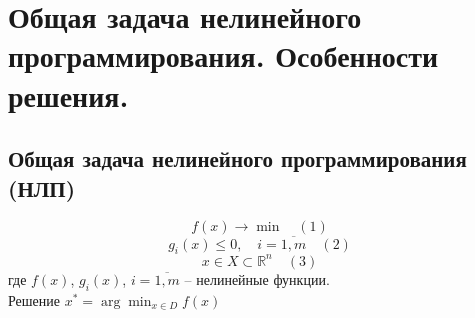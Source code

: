 \documentclass[17pt]{extarticle}
\begin{document}
\section{Общая задача нелинейного \\ программирования. Особенности решения.}
\subsection{Общая задача нелинейного программирования (НЛП)}
\[
    f(x) \rightarrow \min \quad (1)
\]
\[
    g_i(x) \leq 0, \quad i = \overline{1, m} \quad (2)
\]
\[
    x \in X \subset \mathbb{R}^n \quad (3)
\]
где \( f(x) \), \( g_i(x) \), \( i = \overline{1, m} \) -- нелинейные функции. \\
Решение \(x^* = \arg \min_{x \in D} f(x)\)
\end{document}
